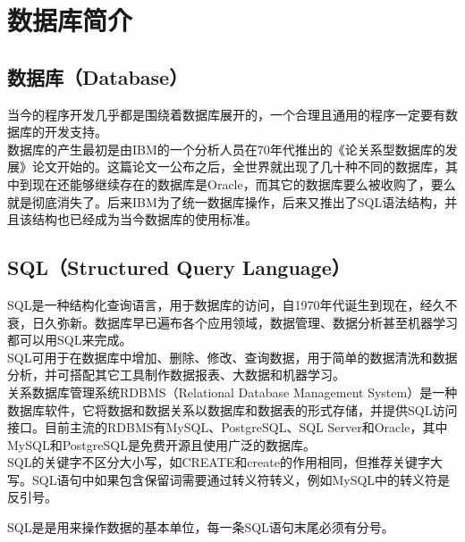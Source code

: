 \documentclass[12pt, openany, oneside]{book}
\begin{document}
\newpage

\pagestyle{plain}
\setcounter{page}{1}
\setcounter{tocdepth}{0}
\tableofcontents

\newpage

\setcounter{page}{1}

\chapter{数据库简介}

\section{数据库（Database）}

当今的程序开发几乎都是围绕着数据库展开的，一个合理且通用的程序一定要有数据库的开发支持。\\

数据库的产生最初是由IBM的一个分析人员在70年代推出的《论关系型数据库的发展》论文开始的。这篇论文一公布之后，全世界就出现了几十种不同的数据库，其中到现在还能够继续存在的数据库是Oracle，而其它的数据库要么被收购了，要么就是彻底消失了。后来IBM为了统一数据库操作，后来又推出了SQL语法结构，并且该结构也已经成为当今数据库的使用标准。\\

\section{SQL（Structured Query Language）}

SQL是一种结构化查询语言，用于数据库的访问，自1970年代诞生到现在，经久不衰，日久弥新。数据库早已遍布各个应用领域，数据管理、数据分析甚至机器学习都可以用SQL来完成。\\

SQL可用于在数据库中增加、删除、修改、查询数据，用于简单的数据清洗和数据分析，并可搭配其它工具制作数据报表、大数据和机器学习。\\

关系数据库管理系统RDBMS（Relational Database Management System）是一种数据库软件，它将数据和数据关系以数据库和数据表的形式存储，并提供SQL访问接口。目前主流的RDBMS有MySQL、PostgreSQL、SQL Server和Oracle，其中MySQL和PostgreSQL是免费开源且使用广泛的数据库。\\

SQL的关键字不区分大小写，如CREATE和create的作用相同，但推荐关键字大写。SQL语句中如果包含保留词需要通过转义符转义，例如MySQL中的转义符是反引号。

SQL是是用来操作数据的基本单位，每一条SQL语句末尾必须有分号。\\
\end{document}
